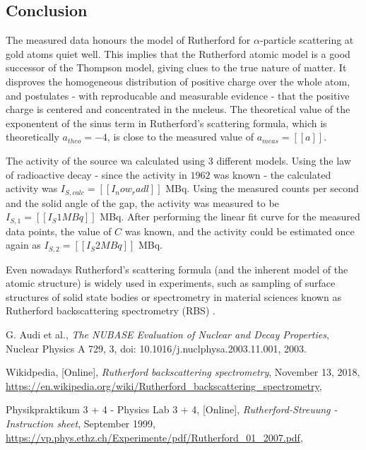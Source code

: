 \documentclass[a4paper]{article}
\begin{document}
\subsection{Conclusion}

The measured data honours the model of Rutherford for $\alpha$-particle scattering at gold atoms quiet well. This implies that the Rutherford atomic model is a good successor of the Thompson model, giving clues to the true nature of matter. It disproves the homogeneous distribution of positive charge over the whole atom, and postulates - with reproducable and measurable evidence - that the positive charge is centered and concentrated in the nucleus. The theoretical value of the exponentent of the sinus term in Rutherford's scattering formula, which is theoretically $a_{theo} = -4$, is close to the measured value of $a_{meas} = [[a]]$.

The activity of the source wa calculated using 3 different models. Using the law of radioactive decay - since the activity in $1962$ was known - the calculated activity was $I_{S,calc} = [[I_now_radl]]$ MBq. Using the measured counts per second and the solid angle of the gap, the activity was measured to be $I_{S,1} = [[I_S1MBq]]$ MBq. After performing the linear fit curve for the measured data points, the value of $C$ was known, and the activity could be estimated once again as $I_{S,2} = [[I_S2MBq]]$ MBq.

Even nowadays Rutherford's scattering formula (and the inherent model of the atomic structure) is widely used in experiments, such as sampling of surface structures of solid state bodies or spectrometry in material sciences known as Rutherford backscattering spectrometry (RBS) \cite{wiki2018}.

\begin{thebibliography}{9}

  G. Audi et al.,
  \textit{The NUBASE Evaluation of Nuclear and Decay Properties},
  Nuclear Physics A 729,
  3,
  doi: 10.1016/j.nuclphysa.2003.11.001,
  2003.

  Wikidpedia, [Online],
  \textit{Rutherford backscattering spectrometry},
  November 13, 2018,
  \url{https://en.wikipedia.org/wiki/Rutherford_backscattering_spectrometry},


  Physikpraktikum 3 + 4 - Physics Lab 3 + 4, [Online],
  \textit{Rutherford-Streuung - Instruction sheet},
  September 1999,
  \url{https://vp.phys.ethz.ch/Experimente/pdf/Rutherford_01_2007.pdf},

\end{thebibliography}
\end{document}
